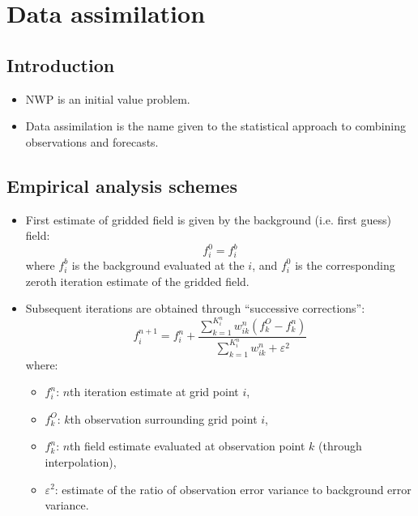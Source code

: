
\section{Data assimilation}
\label{sec:kalnay:data_assimilation}

\subsection{Introduction}
\label{sub:data_assimilation:intro}

\begin{itemize}
    \item NWP is an initial value problem.
    \item Data assimilation is the name given to the statistical approach to combining observations and forecasts.
\end{itemize}

\subsection{Empirical analysis schemes}
\label{sub:data_assimilation:analysis}

\begin{itemize}
    \item First estimate of gridded field is given by the background (i.e. first guess) field:
    \begin{equation}
        f_i^0 = f_i^b
    \end{equation}
    where $f_i^b$ is the background evaluated at the $i$, and $f_i^0$ is the corresponding zeroth iteration estimate of the gridded field.
    \item Subsequent iterations are obtained through ``successive corrections'':
    \begin{equation}
        f_i^{n+1} = f_i^n + 
        \frac{\sum_{k=1}^{K_i^n} w_{ik}^n \left( f_k^O - f_k^n \right)}
        {\sum_{k=1}^{K_i^n} w_{ik}^n + \varepsilon^2}
    \end{equation}
    where:
    \begin{itemize}
        \item $f_i^n$: $n$th iteration estimate at grid point $i$,
        \item $f_k^O$: $k$th observation surrounding grid point $i$,
        \item $f_k^n$: $n$th field estimate evaluated at observation point $k$ (through interpolation),
        \item $\varepsilon^2$: estimate of the ratio of observation error variance to background error variance.
    \end{itemize}
\end{itemize}

